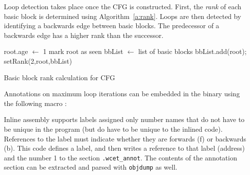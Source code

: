	Loop detection takes place once the CFG is constructed. 
	First, the \emph{rank} of each basic block is determined using Algorithm~\ref{a:rank}. 
	Loops are then detected by identifying a backwards edge between basic blocks. 
	The predecessor of a backwards edge has a higher rank than the successor.

\begin{algorithm}


root.age $\leftarrow$ 1\;
mark root as seen\;
bbList $\leftarrow$ list of basic blocks\;
bbList.add(root);
setRank(2,root,bbList)\;

\caption{Basic block rank calculation for CFG}
\label{a:rank}
\end{algorithm}

Annotations on maximum loop iterations can be embedded in the binary using the following macro \cite{heptane}:


	Inline assembly supports labels assigned only number names that do not have to be unique in the program (but do have to be unique to the inlined code). 
	References to the label must indicate whether they are forwards (f) or backwards (b). 
	This code defines a label, and then writes a reference to that label (address) and the number 1 to the section \texttt{.wcet\_annot}. 
	The contents of the annotation section can be extracted and parsed with \texttt{objdump} as well.



% 


